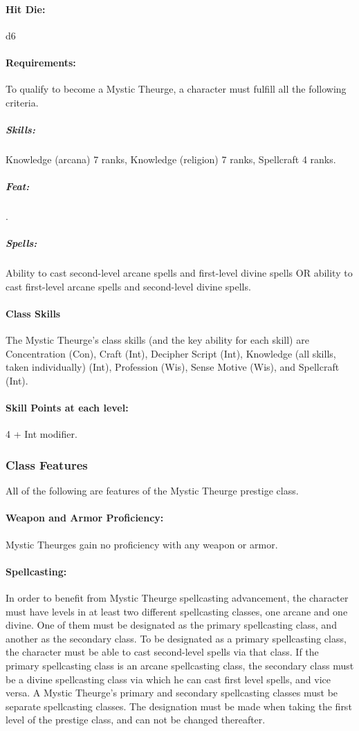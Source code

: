 \paragraph{Hit Die:} d6
\paragraph{Requirements:}
To qualify to become a Mystic Theurge, a character must fulfill all the following criteria.
\subparagraph{Skills:} Knowledge (arcana) 7 ranks, Knowledge (religion) 7 ranks, Spellcraft 4 ranks.
\subparagraph{Feat:} .
\subparagraph{Spells:} Ability to cast second-level arcane spells and first-level divine spells OR ability to cast first-level arcane spells and second-level divine spells.
\paragraph{Class Skills}
The Mystic Theurge's class skills (and the key ability for each skill) are Concentration (Con), Craft (Int), Decipher Script (Int), Knowledge (all skills, taken individually) (Int), Profession (Wis), Sense Motive (Wis), and Spellcraft (Int).
\paragraph{Skill Points at each level:} 4 + Int modifier.

\subsubsection{Class Features}
All of the following are features of the Mystic Theurge prestige class.

\paragraph{Weapon and Armor Proficiency:} Mystic Theurges gain no proficiency with any weapon or armor.

\paragraph{Spellcasting:} In order to benefit from Mystic Theurge spellcasting advancement, the character must have levels in at least two different spellcasting classes, one arcane and one divine. One of them must be designated as the primary spellcasting class, and another as the secondary class. To be designated as a primary spellcasting class, the character must be able to cast second-level spells via that class. If the primary spellcasting class is an arcane spellcasting class, the secondary class must be a divine spellcasting class via which he can cast first level spells, and vice versa. A Mystic Theurge's primary and secondary spellcasting classes must be separate spellcasting classes. The designation must be made when taking the first level of the prestige class, and can not be changed thereafter.

